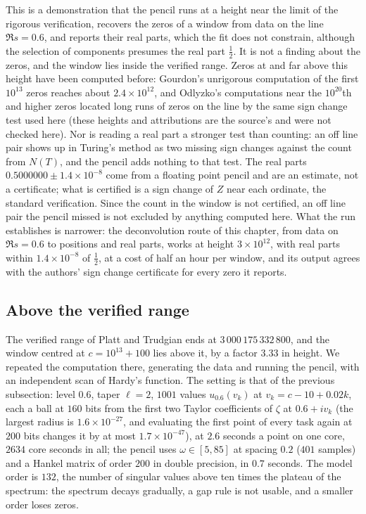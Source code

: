 This is a demonstration that the pencil runs at a height near the limit of the rigorous verification, recovers the zeros of a window from data on the line $\Re s=0.6$, and reports their real parts, which the fit does not constrain, although the selection of components presumes the real part $\tfrac12$. It is not a finding about the zeros, and the window lies inside the verified range. Zeros at and far above this height have been computed before: Gourdon's unrigorous computation of the first $10^{13}$ zeros \cite{Gourdon04} reaches about $2.4\times10^{12}$, and Odlyzko's computations near the $10^{20}$th and higher zeros \cite{Odlyzko92,Odlyzko01} located long runs of zeros on the line by the same sign change test used here (these heights and attributions are the source's and were not checked here). Nor is reading a real part a stronger test than counting: an off line pair shows up in Turing's method as two missing sign changes against the count from $N(T)$, and the pencil adds nothing to that test. The real parts $0.5000000\pm1.4\times10^{-8}$ come from a floating point pencil and are an estimate, not a certificate; what is certified is a sign change of $Z$ near each ordinate, the standard verification. Since the count in the window is not certified, an off line pair the pencil missed is not excluded by anything computed here. What the run establishes is narrower: the deconvolution route of this chapter, from data on $\Re s=0.6$ to positions and real parts, works at height $3\times10^{12}$, with real parts within $1.4\times10^{-8}$ of $\tfrac12$, at a cost of half an hour per window, and its output agrees with the authors' sign change certificate for every zero it reports.

\subsection{Above the verified range}\label{es:sec:above13}

The verified range of Platt and Trudgian ends at $3\,000\,175\,332\,800$, and the window centred at $c=10^{13}+100$ lies above it, by a factor $3.33$ in height. We repeated the computation there, generating the data and running the pencil, with an independent scan of Hardy's function. The setting is that of the previous subsection: level $0.6$, taper $\ell=2$, $1001$ values $u_{0.6}(v_k)$ at $v_k=c-10+0.02k$, each a ball at $160$ bits from the first two Taylor coefficients of $\zeta$ at $0.6+iv_k$ (the largest radius is $1.6\times10^{-27}$, and evaluating the first point of every task again at $200$ bits changes it by at most $1.7\times10^{-47}$), at $2.6$ seconds a point on one core, $2634$ core seconds in all; the pencil uses $\omega\in[5,85]$ at spacing $0.2$ ($401$ samples) and a Hankel matrix of order $200$ in double precision, in $0.7$ seconds. The model order is $132$, the number of singular values above ten times the plateau of the spectrum: the spectrum decays gradually, a gap rule is not usable, and a smaller order loses zeros.

